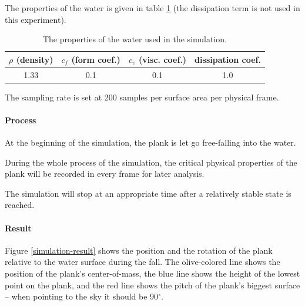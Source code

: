 The properties of the water is given in table \ref{simulation-water-properties} (the dissipation term is not used in this experiment).

\begin{table}[h]
	\centering
	\begin{tabular}{ c c c c }
		\hline
		$\rho$ {\footnotesize(density)} & $c_f$ {\footnotesize(form coef.)} & $c_v$ {\footnotesize(visc. coef.)} & {\small dissipation coef.} \\
		\hline
		1.33 & 0.1 & 0.1 & 1.0 \\
		\hline
	\end{tabular}
	\caption{The properties of the water used in the simulation.}
	\label{simulation-water-properties}
\end{table}

The sampling rate is set at 200 samples per surface area per physical frame.

\paragraph*{Process}

At the beginning of the simulation, the plank is let go free-falling into the water.

During the whole process of the simulation, the critical physical properties of the plank will be recorded in every frame for later analysis.

The simulation will stop at an appropriate time after a relatively stable state is reached.

\paragraph*{Result}

Figure \ref{simulation-result} shows the position and the rotation of the plank relative to the water surface during the fall.
The olive-colored line shows the position of the plank's center-of-mass, the blue line shows the height of the lowest point on the plank, and the red line shows the pitch of the plank's biggest surface -- when pointing to the sky it should be 90$^\circ$.

